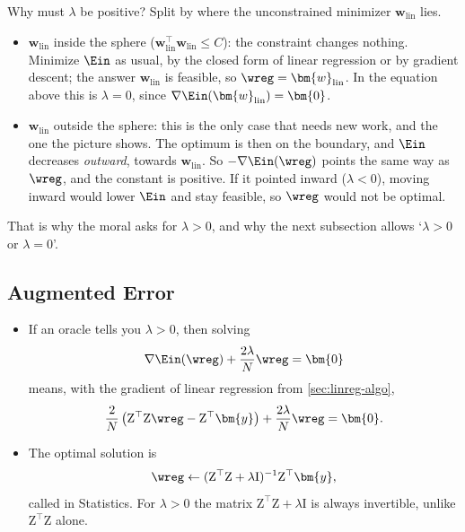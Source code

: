 \begin{remark}
    Why must \(\lambda\) be positive? Split by where the unconstrained
    minimizer \(\bm{w}_{\mathrm{lin}}\) lies.
    \begin{itemize}
        \item \(\bm{w}_{\mathrm{lin}}\) inside the sphere (\(\bm{w}_{\mathrm{lin}}^\top
            \bm{w}_{\mathrm{lin}} \le C\)): the constraint changes nothing.
            Minimize \(\Ein\) as usual, by the closed form of linear regression
            or by gradient descent; the answer \(\bm{w}_{\mathrm{lin}}\) is
            feasible, so \(\wreg = \bm{w}_{\mathrm{lin}}\). In the equation
            above this is \(\lambda = 0\), since \(\nabla
            \Ein(\bm{w}_{\mathrm{lin}}) = \bm{0}\).
        \item \(\bm{w}_{\mathrm{lin}}\) outside the sphere: this is the only
            case that needs new work, and the one the picture shows. The
            optimum is then on the boundary, and \(\Ein\) decreases
            \emph{outward}, towards \(\bm{w}_{\mathrm{lin}}\). So
            \(-\nabla \Ein(\wreg)\) points the same way as \(\wreg\), and the
            constant is positive. If it pointed inward (\(\lambda < 0\)),
            moving inward would lower \(\Ein\) and stay feasible, so \(\wreg\)
            would not be optimal.
    \end{itemize}
    That is why the moral asks for \(\lambda > 0\), and why the next subsection
    allows `\(\lambda > 0\) or \(\lambda = 0\)'.
\end{remark}

\subsection{Augmented Error}

\begin{itemize}
    \item If an oracle tells you \(\lambda > 0\), then solving
        \[
            \nabla \Ein(\wreg) + \frac{2\lambda}{N} \wreg = \bm{0}
        \]
        means, with the gradient of linear regression from
        \autoref{sec:linreg-algo},
        \[
            \frac{2}{N} \left( \mathrm{Z}^\top \mathrm{Z} \wreg -
            \mathrm{Z}^\top \bm{y} \right) + \frac{2\lambda}{N} \wreg =
            \bm{0} .
        \]
    \item The optimal solution is
        \[
            \wreg \leftarrow (\mathrm{Z}^\top \mathrm{Z} + \lambda
            \mathrm{I})^{-1} \mathrm{Z}^\top \bm{y} ,
        \]
        called  in Statistics. For \(\lambda > 0\) the
        matrix \(\mathrm{Z}^\top \mathrm{Z} + \lambda \mathrm{I}\) is always
        invertible, unlike \(\mathrm{Z}^\top \mathrm{Z}\) alone.
\end{itemize}

